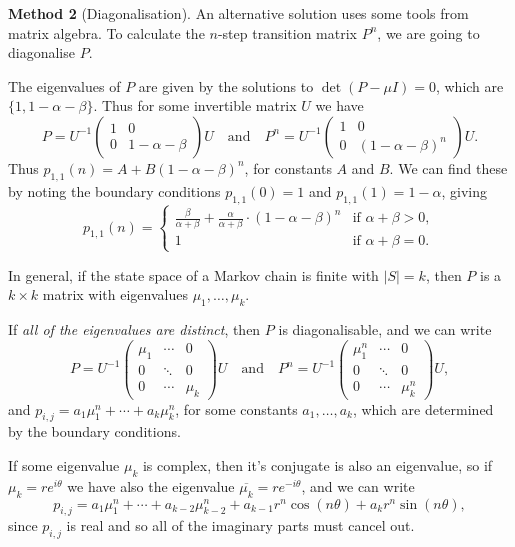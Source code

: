 \begin{example}
	\textbf{Method 2} (Diagonalisation). An alternative solution uses some tools from matrix algebra. To calculate the $n$-step transition matrix $P^n$, we are going to diagonalise $P$.

	The eigenvalues of $P$ are given by the solutions to $\det(P - \mu I) = 0$, which are $\{1, 1 - \alpha - \beta\}$. Thus for some invertible matrix $U$ we have
	$$
	P = U^{-1}\begin{pmatrix}
		1 & 0 \\ 0 & 1 - \alpha - \beta
	\end{pmatrix}U \quad \text{and} \quad P^n = U^{-1} \begin{pmatrix}
		1 & 0 \\ 0 & (1 - \alpha - \beta)^n
	\end{pmatrix}U.
	$$
	Thus $p_{1, 1}(n) = A + B(1 - \alpha - \beta)^n$, for constants $A$ and $B$. We can find these by noting the boundary conditions $p_{1, 1}(0) = 1$ and $p_{1, 1}(1) = 1 - \alpha$, giving
	$$
		p_{1, 1}(n) = \begin{cases}
			\frac{\beta}{\alpha+\beta}+\frac{\alpha}{\alpha+\beta} \cdot(1-\alpha-\beta)^{n} &\mbox{if } \alpha + \beta > 0, \\
			1 &\mbox{if } \alpha + \beta = 0.
		   \end{cases}
	$$
\end{example}

In general, if the state space of a Markov chain is finite with $|S| = k$, then $P$ is a $k \times k$ matrix with eigenvalues $\mu_1, \dots, \mu_k$.

If \emph{all of the eigenvalues are distinct}, then $P$ is diagonalisable, and we can write
$$
P = U^{-1} \begin{pmatrix}
	\mu_1 & \cdots & 0 \\
	0 & \ddots & 0 \\
	0 & \cdots & \mu_k
\end{pmatrix} U \quad \text{and} \quad P^n = U^{-1} \begin{pmatrix}
	\mu_1^n & \cdots & 0 \\
	0 & \ddots & 0 \\
	0 & \cdots & \mu_k^n
\end{pmatrix} U,
$$
and $p_{i,j} = a_1 \mu_1^n + \cdots + a_k \mu_k^n$, for some constants $a_1, \dots, a_k$, which are determined by the boundary conditions.

If some eigenvalue $\mu_k$ is complex, then it's conjugate is also an eigenvalue, so if $\mu_k = re^{i \theta}$ we have also the eigenvalue $\overline{\mu_k} = re^{-i \theta}$, and we can write
$$
p_{i, j} = a_1 \mu_1^n + \cdots + a_{k - 2}\mu_{k - 2}^n + a_{k - 1}r^n \cos(n \theta) + a_k r^n \sin (n \theta),
$$
since $p_{i, j}$ is real and so all of the imaginary parts must cancel out.


